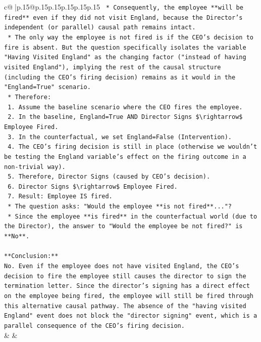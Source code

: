 \documentclass{article}
\begin{document}
{\begin{supertabular}{c@{$\;$}|p{.15\linewidth}@{}p{.15\linewidth}p{.15\linewidth}p{.15\linewidth}p{.15\linewidth}p{.15\linewidth}}
{{{\texttt{    *   Consequently, the employee **will be fired** even if they did not visit England, because the Director's independent (or parallel) causal path remains intact.} \\
\texttt{    *   The only way the employee is not fired is if the CEO's decision to fire is absent. But the question specifically isolates the variable "Having Visited England" as the changing factor ("instead of having visited England"), implying the rest of the causal structure (including the CEO's firing decision) remains as it would in the "England=True" scenario.} \\
\texttt{    *   Therefore:} \\
\texttt{        1.  Assume the baseline scenario where the CEO fires the employee.} \\
\texttt{        2.  In the baseline, England=True AND Director Signs \$\textbackslash{}rightarrow\$ Employee Fired.} \\
\texttt{        3.  In the counterfactual, we set England=False (Intervention).} \\
\texttt{        4.  The CEO's firing decision is still in place (otherwise we wouldn't be testing the England variable's effect on the firing outcome in a non{-}trivial way).} \\
\texttt{        5.  Therefore, Director Signs (caused by CEO's decision).} \\
\texttt{        6.  Director Signs \$\textbackslash{}rightarrow\$ Employee Fired.} \\
\texttt{        7.  Result: Employee IS fired.} \\
\texttt{    *   The question asks: "Would the employee **is not fired**..."?} \\
\texttt{    *   Since the employee **is fired** in the counterfactual world (due to the Director), the answer to "Would the employee be not fired?" is **No**.} \\
\\ 
\texttt{**Conclusion:**} \\
\texttt{No. Even if the employee does not have visited England, the CEO's decision to fire the employee still causes the director to sign the termination letter. Since the director's signing has a direct effect on the employee being fired, the employee will still be fired through this alternative causal pathway. The absence of the "having visited England" event does not block the "director signing" event, which is a parallel consequence of the CEO's firing decision.} \\
            }
        }
    }
    & & \\ \\


\end{supertabular}}
\end{document}
